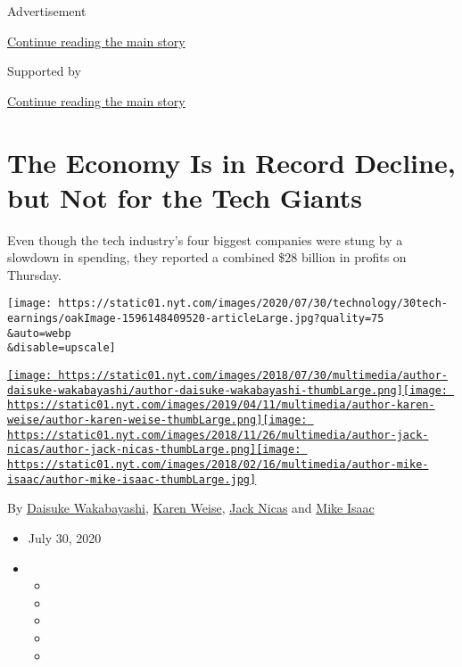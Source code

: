 Advertisement

\protect\hyperlink{after-top}{Continue reading the main story}

Supported by

\protect\hyperlink{after-sponsor}{Continue reading the main story}

\hypertarget{the-economy-is-in-record-decline-but-not-for-the-tech-giants}{%
\section{The Economy Is in Record Decline, but Not for the Tech
Giants}\label{the-economy-is-in-record-decline-but-not-for-the-tech-giants}}

Even though the tech industry's four biggest companies were stung by a
slowdown in spending, they reported a combined \$28 billion in profits
on Thursday.

\texttt{[image: https://static01.nyt.com/images/2020/07/30/technology/30tech-earnings/oakImage-1596148409520-articleLarge.jpg?quality=75\\\&auto=webp\\\&disable=upscale]}

\href{https://www.nytimes.com/by/daisuke-wakabayashi}{\texttt{[image: https://static01.nyt.com/images/2018/07/30/multimedia/author-daisuke-wakabayashi/author-daisuke-wakabayashi-thumbLarge.png]}}\href{https://www.nytimes.com/by/karen-weise}{\texttt{[image: https://static01.nyt.com/images/2019/04/11/multimedia/author-karen-weise/author-karen-weise-thumbLarge.png]}}\href{https://www.nytimes.com/by/jack-nicas}{\texttt{[image: https://static01.nyt.com/images/2018/11/26/multimedia/author-jack-nicas/author-jack-nicas-thumbLarge.png]}}\href{https://www.nytimes.com/by/mike-isaac}{\texttt{[image: https://static01.nyt.com/images/2018/02/16/multimedia/author-mike-isaac/author-mike-isaac-thumbLarge.jpg]}}

By \href{https://www.nytimes.com/by/daisuke-wakabayashi}{Daisuke
Wakabayashi}, \href{https://www.nytimes.com/by/karen-weise}{Karen
Weise}, \href{https://www.nytimes.com/by/jack-nicas}{Jack Nicas} and
\href{https://www.nytimes.com/by/mike-isaac}{Mike Isaac}

\begin{itemize}
\item
  July 30, 2020
\item
  \begin{itemize}
  \item
  \item
  \item
  \item
  \item
  \end{itemize}
\end{itemize}

